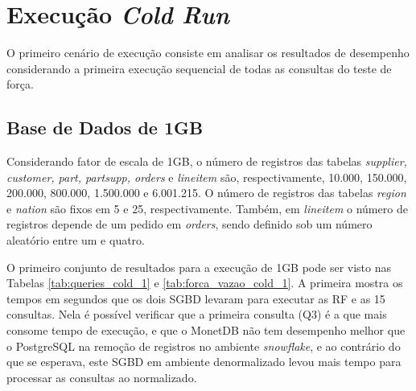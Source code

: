 
\section{Execução \textit{Cold Run}}

O primeiro cenário de execução consiste em analisar os resultados de desempenho considerando a primeira execução sequencial de todas as consultas do teste de força. 

\subsection{Base de Dados de 1GB}

Considerando fator de escala de 1GB, o número de registros das tabelas \textit{supplier, customer, part, partsupp, orders} e \textit{lineitem} são, respectivamente, 10.000, 150.000, 200.000, 800.000, 1.500.000 e 6.001.215. O número de registros das tabelas \textit{region} e \textit{nation} são fixos em 5 e 25, respectivamente. Também, em \textit{lineitem} o número de registros depende de um pedido em \textit{orders}, sendo definido sob um número aleatório entre um e quatro.

O primeiro conjunto de resultados para a execução de 1GB pode ser visto nas Tabelas \ref{tab:queries_cold_1} e \ref{tab:forca_vazao_cold_1}. A primeira mostra os tempos em segundos que os dois SGBD levaram para executar as RF e as 15 consultas. Nela é possível verificar que a primeira consulta (Q3) é a que mais consome tempo de execução, e que o MonetDB não tem desempenho melhor que o PostgreSQL na remoção de registros no ambiente \textit{snowflake}, e ao contrário do que se esperava, este SGBD em ambiente denormalizado levou mais tempo para processar as consultas ao normalizado. 

